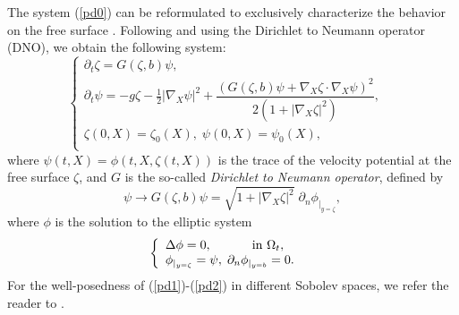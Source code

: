 \documentclass[11pt]{article}
\begin{document}
The system (\ref{pd0}) can be reformulated to exclusively characterize the behavior on the free surface \cite{zakharov1968stability}. Following \cite{craig1993numerical} and using  the Dirichlet to Neumann operator (DNO), we obtain the following system: 
\begin{equation}\label{pd1}
\left\{
\begin{array}{ll}
\partial_t\zeta =G(\zeta,b)\psi ,\quad \\
		\partial_t\psi=-g\zeta-\frac{1}{2}\left|\nabla_X\psi\right|^2+\dfrac{\left(     G(\zeta,b)\psi+\nabla_X\zeta\cdot\nabla_X\psi\right)^2}{2\left(1+|\nabla_X\zeta|^2\right)}, \quad \\
		\zeta(0,X)=\zeta_0(X),\;\psi(0,X)=\psi_0(X),\quad\\
\end{array}
\right.
\end{equation}
where $\psi(t,X)=\phi(t,X,\zeta(t,X))$ is the trace of the velocity potential at the free surface $\zeta$, and  $G$ is the so-called \textit{Dirichlet to Neumann operator}, defined by 
\begin{equation}\label{Gthe DNO}
	\psi\longrightarrow G(\zeta,b)\psi=\sqrt{1+|\nabla_X\zeta|^2}\;\partial_n\phi_{|_{y=\zeta}},
\end{equation}
where $\phi$ is the solution to the elliptic system 
\begin{equation}\label{pd2}
	\left\{
	\begin{array}{ll}
		\Delta\phi =0,\hspace{1.01cm} \textrm{ in }  \Omega_t,\\
		\phi_{|_{y=\zeta}}=\psi,\;\partial_n\phi_{|_{y=b}} =0.\quad\\
	\end{array}
	\right.
\end{equation}
For the well-posedness of (\ref{pd1})-(\ref{pd2}) in different Sobolev spaces, we refer the reader to \cite{alazard2016cauchy,lannes2013water}.
\end{document}
